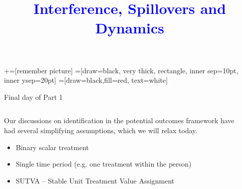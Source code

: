 \documentclass[notes,11pt, aspectratio=169]{beamer}
\title[]{\textcolor{blue}{Interference, Spillovers and Dynamics}}
\author[PGP]{}
\institute[FRBNY]{\small{Paul Goldsmith-Pinkham}}
\newenvironment{wideitemize}{\itemize\addtolength{\itemsep}{10pt}}{\enditemize}
\begin{document}
\newcommand\marktopleft[1]{%
    \tikz[overlay,remember picture] 
        \node (marker-#1-a) at (-.3em,.3em) {};%
}
\newcommand\markbottomright[2]{%
    \tikz[overlay,remember picture] 
        \node (marker-#1-b) at (0em,0em) {};%
}
+=[remember picture] 
 =[draw=black, very thick, rectangle, inner sep=10pt, inner ysep=20pt]
 =[draw=black,fill=red, text=white]

\begin{frame}
\maketitle

\end{frame}

\begin{frame}{Final day of Part 1}
\begin{columns}[T] %
  \begin{column}{.75\textwidth}
   \begin{wideitemize}
   \item Our discussions on identification in the potential outcomes
     framework have had several simplifying assumptions, which we will
     relax today.
     \begin{itemize}
     \item Binary scalar treatment
     \item Single time period (e.g. one treatment within the person)
     \item SUTVA -- Stable Unit Treatment Value Assignment
     \end{itemize}
  \end{wideitemize}

\end{column}%
  \hfill%
  \begin{column}{.5\textwidth}
    \begin{center}
    \end{center}
  \end{column}
\end{columns}
\end{frame}
\end{document}
